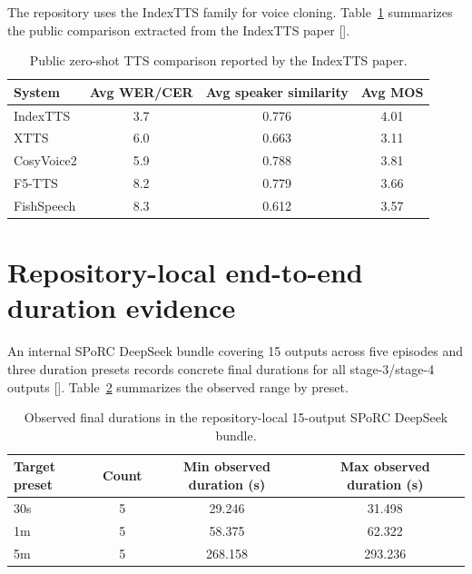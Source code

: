 The repository uses the IndexTTS family for voice cloning. Table~\ref{tab:tts-public} summarizes the public comparison extracted from the IndexTTS paper [\cite{indextts2025,indextts_repo}].

\begin{table}[H]
\centering
\small
\begin{tabular}{lccc}
\toprule
System & Avg WER/CER & Avg speaker similarity & Avg MOS \\
\midrule
IndexTTS & 3.7 & 0.776 & 4.01 \\
XTTS & 6.0 & 0.663 & 3.11 \\
CosyVoice2 & 5.9 & 0.788 & 3.81 \\
F5-TTS & 8.2 & 0.779 & 3.66 \\
FishSpeech & 8.3 & 0.612 & 3.57 \\
\bottomrule
\end{tabular}
\caption{Public zero-shot TTS comparison reported by the IndexTTS paper.}
\label{tab:tts-public}
\end{table}

\section{Repository-local end-to-end duration evidence}

An internal SPoRC DeepSeek bundle covering 15 outputs across five episodes and three duration presets records concrete final durations for all stage-3/stage-4 outputs [\cite{internal_deepseek_bundle_20260324}]. Table~\ref{tab:stage3-duration-bundle} summarizes the observed range by preset.

\begin{table}[H]
\centering
\small
\begin{tabular}{lccc}
\toprule
Target preset & Count & Min observed duration (s) & Max observed duration (s) \\
\midrule
30s & 5 & 29.246 & 31.498 \\
1m & 5 & 58.375 & 62.322 \\
5m & 5 & 268.158 & 293.236 \\
\bottomrule
\end{tabular}
\caption{Observed final durations in the repository-local 15-output SPoRC DeepSeek bundle.}
\label{tab:stage3-duration-bundle}
\end{table}
